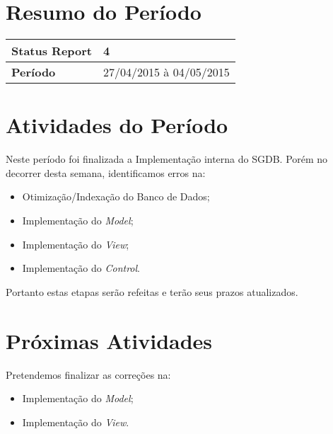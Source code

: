 \documentclass[a4paper,12pt]{article}
\begin{document}

\newpage

\section{Resumo do Período}

\begin{longtable}{|l|l|}
\hline
\textbf{Status Report} & 4\\
\hline
\textbf{Período}	&	27/04/2015 à 04/05/2015 \\
\hline
\end{longtable}


\section{Atividades do Período}

Neste período foi finalizada a Implementação interna do SGDB. Porém no decorrer desta semana, identificamos erros na:

\begin{itemize}

\item{Otimização/Indexação do Banco de Dados;}

\item{Implementação do \textit{Model};}

\item{Implementação do \textit{View};}

\item{Implementação do \textit{Control}.}


\end{itemize}

Portanto estas etapas serão refeitas e terão seus prazos atualizados.


\section{Próximas Atividades}

Pretendemos finalizar as correções na:

\begin{itemize}

\item{Implementação do \textit{Model};}

\item{Implementação do \textit{View}.}

\end{itemize}
\end{document}
